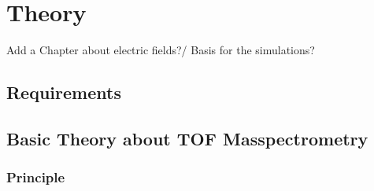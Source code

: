 \section{Theory}
	Add a Chapter about electric fields?/ Basis for the simulations?
	\subsection{Requirements}
	
	\subsection{Basic Theory about TOF Masspectrometry} %
	
	
	\subsubsection{Principle} %
	
